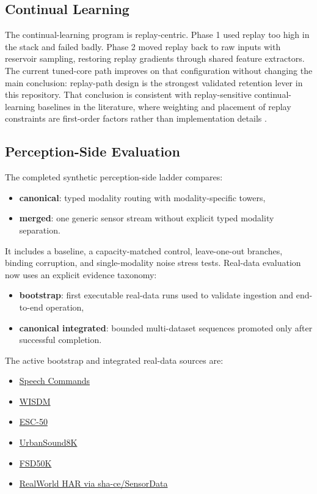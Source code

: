 \documentclass{article}
\begin{document}
\subsection{Continual Learning}

The continual-learning program is replay-centric. Phase 1 used replay too high in the stack and failed badly. Phase 2 moved replay back to raw inputs with reservoir sampling, restoring replay gradients through shared feature extractors. The current tuned-core path improves on that configuration without changing the main conclusion: replay-path design is the strongest validated retention lever in this repository. That conclusion is consistent with replay-sensitive continual-learning baselines in the literature, where weighting and placement of replay constraints are first-order factors rather than implementation details \citep{chaudhry2019,buzzega2020}.

\subsection{Perception-Side Evaluation}

The completed synthetic perception-side ladder compares:
\begin{itemize}[leftmargin=*]
  \item \textbf{canonical}: typed modality routing with modality-specific towers,
  \item \textbf{merged}: one generic sensor stream without explicit typed modality separation.
\end{itemize}
It includes a baseline, a capacity-matched control, leave-one-out branches, binding corruption, and single-modality noise stress tests. Real-data evaluation now uses an explicit evidence taxonomy:
\begin{itemize}[leftmargin=*]
  \item \textbf{bootstrap}: first executable real-data runs used to validate ingestion and end-to-end operation,
  \item \textbf{canonical integrated}: bounded multi-dataset sequences promoted only after successful completion.
\end{itemize}

The active bootstrap and integrated real-data sources are:
\begin{itemize}[leftmargin=*]
  \item \href{https://huggingface.co/datasets/google/speech_commands}{Speech Commands}
  \item \href{https://archive.ics.uci.edu/dataset/507/wisdm\%2Bsmartphone\%2Band\%2Bsmartwatch\%2Bactivity\%2Band\%2Bbiometrics\%2Bdataset}{WISDM}
  \item \href{https://github.com/karolpiczak/ESC-50}{ESC-50}
  \item \href{https://urbansounddataset.weebly.com/urbansound8k.html}{UrbanSound8K}
  \item \href{https://zenodo.org/records/4060432}{FSD50K}
  \item \href{https://huggingface.co/datasets/sha-ce/SensorData}{RealWorld HAR via sha-ce/SensorData}
\end{itemize}
\end{document}
